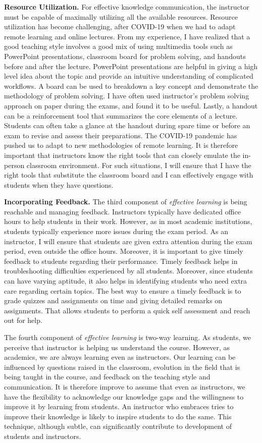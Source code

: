 \documentclass{NSF}
\newcommand{\BfPara}[1]{{\noindent\textbf{#1.}}\xspace}
\begin{document}
\BfPara{Resource Utilization} For effective knowledge communication, the instructor must be capable of maximally utilizing all the available resources. Resource utilization has become challenging, after COVID-19 when we had to adapt remote learning and online lectures. From my experience, I have realized that a good teaching style involves a good mix of using multimedia tools such as PowerPoint presentations, classroom board for problem solving, and handouts before and after the lecture. PowerPoint presentations are helpful in giving a high level idea about the topic and provide an intuitive understanding of complicated workflows. A board can be used to breakdown a key concept and demonstrate the methodology of problem solving. I have often used instructor's problem solving approach on paper during the exams, and found it to be useful. Lastly, a handout can be a reinforcement tool that summarizes the core elements of a lecture. Students can often take a glance at the handout during spare time or before an exam to revise and assess their preparations. The COVID-19 pandemic has pushed us to adapt to new methodologies of remote learning. It is therefore important that instructors know the right tools that can closely emulate the in-person classroom environment. For such situations, I will ensure that I have the right tools that substitute the classroom board and I can effectively engage with students when they have questions. 


\BfPara{Incorporating Feedback} The third component of {\em effective learning} is being reachable and managing feedback. Instructors typically have dedicated office hours to help students in their work. However, as in most academic institutions, students typically experience more issues during the exam period. As an instructor, I will ensure that students are given extra attention during the exam period, even outside the office hours. Moreover, it is important to give timely feedback to students regarding their performance. Timely feedback helps in troubleshooting difficulties experienced by all students. Moreover, since students can have varying aptitude, it also helps in identifying students who need extra care regarding certain topics. The best way to ensure a timely feedback is to grade quizzes and assignments on time and giving detailed remarks on assignments. That allows students to perform a quick self assessment and reach out for help. 


The fourth component of {\em effective learning} is two-way learning. As students, we perceive that instructor is helping us understand the course. However, as academics, we are always learning even as instructors. Our learning can be influenced by questions raised in the classroom, evolution in the field that is being taught in the course, and feedback on the teaching style and communication. It is therefore improve to assume that even as instructors, we have the flexibility to acknowledge our knowledge gaps and the willingness to improve it by learning from students. An instructor who embraces tries to improve their knowledge is likely to inspire students to do the same. This technique, although subtle, can significantly contribute to development of students and instructors. 
\end{document}

